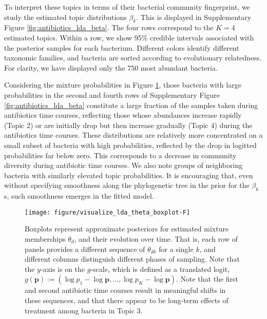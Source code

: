 \documentclass[oupdraft]{bio}
\begin{document}
To interpret these topics in terms of their bacterial community fingerprint, we
study the estimated topic distributions $\beta_{k}$. This is displayed in
Supplementary Figure \ref{fig:antibiotics_lda_beta}. The four rows correspond to
the $K = 4$ estimated topics. Within a row, we show 95\% credible intervals
associated with the posterior samples for each bacterium. Different colors
identify different taxonomic families, and bacteria are sorted according to
evolutionary relatedness. For clarity, we have displayed only the 750 most
abundant bacteria.

Considering the mixture probabilities in Figure \ref{fig:antibiotics_lda_theta},
those bacteria with large probabilities in the second and fourth rows of
Supplementary Figure \ref{fig:antibiotics_lda_beta} constitute a large fraction
of the samples taken during antibiotics time courses, reflecting those whose
abundances increase rapidly (Topic 2) or are initially drop but then increase
gradually (Topic 4) during the antibiotics time courses. These distributions are
relatively more concentrated on a small subset of bacteria with high
probabilities, reflected by the drop in logitted probabilities far below zero.
This corresponds to a decrease in community diversity during antibiotic time
courses. We also note groups of neighboring bacteria with similarly elevated
topic probabilities. It is encouraging that, even without specifying smoothness
along the phylogenetic tree in the prior for the $\beta_{k}$s, such smoothness
emerges in the fitted model.

\begin{figure}
  \centering\texttt{[image: figure/visualize\_lda\_theta\_boxplot-F]}
  \caption{Boxplots represent approximate posteriors for estimated mixture
    memberships $\theta_{d}$, and their evolution over time. That is, each row
    of panels provides a different sequence of $\theta_{dk}$ for a single $k$,
    and different columns distinguish different phases of sampling. Note that
    the $y$-axis is on the $g$-scale, which is defined as a translated logit,
    $g\left(\mathbf{p}\right) := \left(\log p_{1} - \overline{\log \mathbf{p}},
    \dots,\log p_{K} - \overline{\log \mathbf{p}}\right)$. Note that the first
    and second antibiotic time courses result in meaningful shifts in these
    sequences, and that there appear to be long-term effects of treatment among
    bacteria in Topic 3. \label{fig:antibiotics_lda_theta}}
\end{figure}
\end{document}
